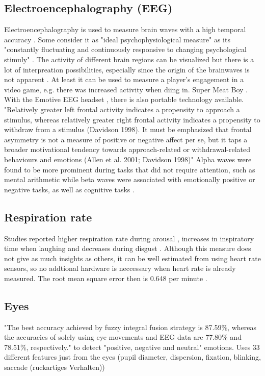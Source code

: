 \subsection{Electroencephalography (EEG)}
Electroencephalography is used to measure brain waves with a high temporal accuracy \cite{nacke2015physiological}. Some consider it as "ideal psychophysiological measure" as its "constantly fluctuating and continuously responsive to changing psychological stimuly" \cite{hatfield87psychophysiology}. The activity of different brain regions can be visualized but there is a lot of interpreation possibilities, especially since the origin of the brainwaves is not apparent \cite{nacke2015physiological}. At least it can be used to measure a player's engagement in a video game, e.g. there was increased activity when diing in. Super Meat Boy \cite{mcmahan2018evaluating}. With the Emotive EEG headset \cite{link_emotiv}, there is also portable technology available.
"Relatively greater left frontal activity indicates a propensity to approach a stimulus, whereas relatively greater right frontal activity indicates a propensity to withdraw from a stimulus (Davidson 1998). It must be emphasized that
frontal asymmetry is not a measure of positive or negative affect per se, but it taps a broader motivational tendency towards approach-related or withdrawal-related behaviours and emotions (Allen et al. 2001; Davidson 1998)" \cite{kivikangas2011review}
Alpha waves were found to be more prominent during tasks that did not require attention, such as mental arithmetic while beta waves were associated with emotionally positive or negative tasks, as well as cognitive tasks \cite{ray85eeg}.


\subsection{Respiration rate}
Studies reported higher respiration rate during arousal \cite{homma2008breathing}, increases in inspiratory time when laughing and decreases during disgust \cite{boiten1998effects}. Although this measure does not give as much insights as others, it can be well estimated from using heart rate sensors, so no addtional hardware is neccessary when heart rate is already measured. The root mean square error then is 0.648 per minute \cite{natarajan2021measurement}.

\subsection{Eyes}
"The best accuracy achieved by fuzzy integral fusion strategy is 87.59\%, whereas the accuracies of solely using eye movements and EEG data are 77.80\% and 78.51\%, respectively." to detect "positive, negative and neutral" emotions. Uses 33 different features just from the eyes (pupil diameter, dispersion, fixation, blinking, saccade (ruckartiges Verhalten))\cite{lu15combining}

